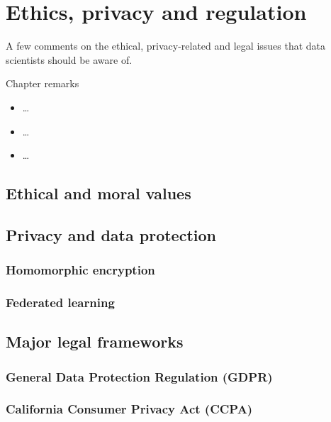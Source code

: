 \chapter{Ethics, privacy and regulation}
\label{chap:ethics}
\glsresetall


A few comments on the ethical, privacy-related and legal issues that data scientists should be aware of.

\begin{mainbox}{Chapter remarks}


  \startcontents[chapters]
  \vspace{1em}


  \begin{itemize}
    \item \dots
  \end{itemize}


  \begin{itemize}
    \item \dots
  \end{itemize}


  \begin{itemize}
    \item \dots
  \end{itemize}
\end{mainbox}

{}
\clearpage

\section{Ethical and moral values}

\section{Privacy and data protection}

\subsection{Homomorphic encryption}

\subsection{Federated learning}

\section{Major legal frameworks}

\subsection{General Data Protection Regulation (GDPR)}

\subsection{California Consumer Privacy Act (CCPA)}
